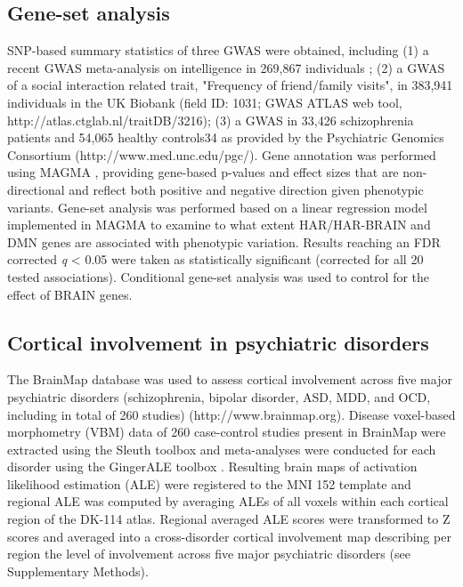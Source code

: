 \begin{refsection}
\subsection*{Gene-set analysis}
SNP-based summary statistics of three GWAS were obtained, including (1) a recent GWAS meta-analysis on intelligence in 269,867 individuals \citep{Savage2018GenomewideAM}; (2) a GWAS of a social interaction related trait, "Frequency of friend/family visits", in 383,941 individuals in the UK Biobank \citep{Watanabe2019AGO} (field ID: 1031; GWAS ATLAS web tool, http://atlas.ctglab.nl/traitDB/3216); (3) a GWAS in 33,426 schizophrenia patients and 54,065 healthy controls34 as provided by the Psychiatric Genomics Consortium (http://www.med.unc.edu/pgc/). Gene annotation was performed using MAGMA \citep{de2015magma}, providing gene-based p-values and effect sizes that are non-directional and reflect both positive and negative direction given phenotypic variants. Gene-set analysis was performed based on a linear regression model implemented in MAGMA \citep{de2015magma} to examine to what extent HAR/HAR-BRAIN and DMN genes are associated with phenotypic variation. Results reaching an FDR corrected \textit{q} < 0.05 were taken as statistically significant (corrected for all 20 tested associations). Conditional gene-set analysis \citep{de2018conditional} was used to control for the effect of BRAIN genes.

\subsection*{Cortical involvement in psychiatric disorders}
The BrainMap database was used to assess cortical involvement across five major psychiatric disorders (schizophrenia, bipolar disorder, ASD, MDD, and OCD, including in total of 260 studies) (http://www.brainmap.org). Disease voxel-based morphometry (VBM) data of 260 case-control studies present in BrainMap were extracted using the Sleuth toolbox \citep{Fox2002MappingCA} and meta-analyses were conducted for each disorder using the GingerALE toolbox \citep{Eickhoff2009CoordinatebasedAL}. Resulting brain maps of activation likelihood estimation (ALE) were registered to the MNI 152 template and regional ALE was computed by averaging ALEs of all voxels within each cortical region of the DK-114 atlas. Regional averaged ALE scores were transformed to Z scores and averaged into a cross-disorder cortical involvement map describing per region the level of involvement across five major psychiatric disorders (see Supplementary Methods).


\end{refsection}
